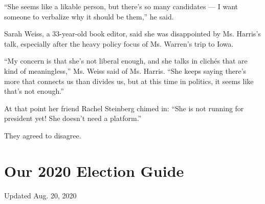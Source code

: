 ``She seems like a likable person, but there's so many candidates --- I
want someone to verbalize why it should be them,'' he said.

Sarah Weiss, a 33-year-old book editor, said she was disappointed by Ms.
Harris's talk, especially after the heavy policy focus of Ms. Warren's
trip to Iowa.

``My concern is that she's not liberal enough, and she talks in clichés
that are kind of meaningless,'' Ms. Weiss said of Ms. Harris. ``She
keeps saying there's more that connects us than divides us, but at this
time in politics, it seems like that's not enough.''

At that point her friend Rachel Steinberg chimed in: ``She is not
running for president yet! She doesn't need a platform.''

They agreed to disagree.

\hypertarget{our-2020-election-guide}{%
\section{Our 2020 Election Guide}\label{our-2020-election-guide}}

Updated Aug. 20, 2020

